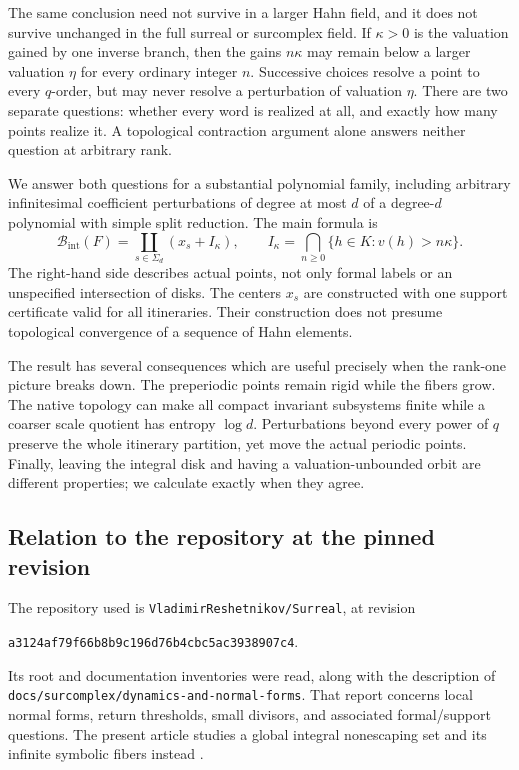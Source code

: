 \documentclass[11pt,a4paper]{article}
\numberwithin{equation}{section}
\theoremstyle{plain}
\theoremstyle{definition}
\theoremstyle{remark}
\newcommand{\Ik}{I_\kappa}
\newcommand{\BI}{\mathcal B_{\mathrm{int}}}
\newcommand{\Sig}{\Sigma_d}
\begin{document}
The same conclusion need not survive in a larger Hahn field, and it does
not survive unchanged in the full surreal or surcomplex field. If
$\kappa>0$ is the valuation gained by one inverse branch, then the gains
$n\kappa$ may remain below a larger valuation $\eta$ for every ordinary
integer $n$. Successive choices resolve a point to every $q$-order, but
may never resolve a perturbation of valuation $\eta$. There are two
separate questions: whether every word is realized at all, and exactly
how many points realize it. A topological contraction argument alone
answers neither question at arbitrary rank.

We answer both questions for a substantial polynomial family, including
arbitrary infinitesimal coefficient perturbations of degree at most $d$
of a degree-$d$ polynomial with simple split reduction. The main formula is
\begin{equation}\label{epd:eq:intro-fibers}
 \BI(F)=\coprod_{s\in\Sig}(x_s+\Ik),
 \qquad
 \Ik=\bigcap_{n\geq0}\{h\in K:v(h)>n\kappa\}.
\end{equation}
The right-hand side describes actual points, not only formal labels or
an unspecified intersection of disks. The centers $x_s$ are constructed
with one support certificate valid for all itineraries. Their
construction does not presume topological convergence of a sequence of
Hahn elements.

The result has several consequences which are useful precisely when the
rank-one picture breaks down. The preperiodic points remain rigid while
the fibers grow. The native topology can make all compact invariant
subsystems finite while a coarser scale quotient has entropy $\log d$.
Perturbations beyond every power of $q$ preserve the whole itinerary
partition, yet move the actual periodic points. Finally, leaving the
integral disk and having a valuation-unbounded orbit are different
properties; we calculate exactly when they agree.

\subsection{Relation to the repository at the pinned revision}
\label{epd:subsec:repo-pin}
The repository used is \texttt{VladimirReshetnikov/Surreal}, at revision
\begin{center}
\small\texttt{a3124af79f66b8b9c196d76b4cbc5ac3938907c4}.
\end{center}
Its root and documentation inventories
were read, along with the description of
\nolinkurl{docs/surcomplex/dynamics-and-normal-forms}. That report concerns
local normal forms, return thresholds, small divisors, and associated
formal/support questions. The present article studies a global integral
nonescaping set and its infinite symbolic fibers instead \cite{Repo,RepoDynamics}.
\end{document}
